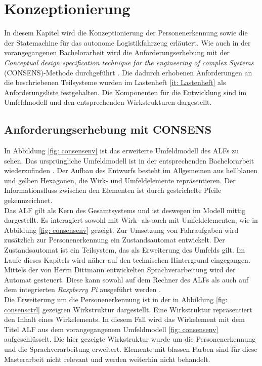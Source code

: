 \chapter{Konzeptionierung}
\label{ch: Konzeptionierung}

In diesem Kapitel wird die Konzeptionierung der Personenerkennung sowie die der Statemachine für das autonome Logistikfahrzeug erläutert. Wie auch in der vorangegangenen Bachelorarbeit wird die Anforderungserhebung mit der \textit{Conceptual design specification technique for the engineering of complex Systems} (CONSENS)-Methode durchgeführt \cite{Bachelorarbeit}. Die dadurch erhobenen Anforderungen an die beschriebenen Teilsysteme wurden im Lastenheft \ref{it: Lastenheft} als Anforderungsliste festgehalten. Die Komponenten für die Entwicklung sind im Umfeldmodell und den entsprechenden Wirkstrukturen dargestellt.
	
	
	\section{Anforderungserhebung mit CONSENS}
	\label{sec: Anforderungserhebung}
	
	In Abbildung \ref{fig: consensenv} ist das erweiterte Umfeldmodell des ALFs zu sehen. Das ursprüngliche Umfeldmodell ist in der entsprechenden Bachelorarbeit wiederzufinden \cite{Bachelorarbeit}. Der Aufbau des Entwurfs besteht im Allgemeinen aus hellblauen und gelben Hexagonen, die Wirk- und Umfeldelemente repräsentieren. Der Informationsfluss zwischen den Elementen ist durch gestrichelte Pfeile gekennzeichnet.\\
	
	Das ALF gilt als Kern des Gesamtsystems und ist deswegen im Modell mittig dargestellt. Es interagiert sowohl mit Wirk- als auch mit Umfeldelementen, wie in Abbildung \ref{fig: consensenv} gezeigt. Zur Umsetzung von Fahraufgaben wird zusätzlich zur Personenerkennung ein Zustandsautomat entwickelt. Der Zustandsautomat ist ein Teilsystem, das als Erweiterung des Umfelds gilt. Im Laufe dieses Kapitels wird näher auf den technischen Hintergrund eingegangen. Mittels der von Herrn Dittmann entwickelten Sprachverarbeitung wird der Automat gesteuert. Diese kann sowohl auf dem Rechner des ALFs als auch auf dem integrierten \textit{Raspberry Pi} ausgeführt werden \cite{Dittmann}. \\
	
		
	
	Die Erweiterung um die Personenerkennung ist in der in Abbildung \ref{fig: consensctrl} gezeigten Wirkstruktur dargestellt. Eine Wirkstruktur repräsentiert den Inhalt eines Wirkelements. In diesem Fall wird das Wirkelement mit dem Titel ALF aus dem vorangegangenem Umfeldmodell \ref{fig: consensenv} aufgeschlüsselt. Die hier gezeigte Wirkstruktur wurde um die Personenerkennung und die Sprachverarbeitung erweitert. Elemente mit blassen Farben sind für diese Masterarbeit nicht relevant und werden weiterhin nicht behandelt.\\
	
